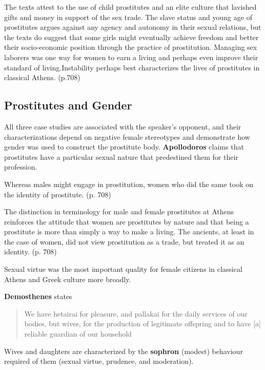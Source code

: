 The texts attest to the use of child prostitutes and an elite culture that lavished gifts and money in support of the sex trade. The slave status and young age of prostitutes argues against any agency and autonomy in their sexual relations, but the texts do suggest that some girls might eventually achieve freedom and better their socio-economic position through the practice of prostitution. Managing sex laborers was one way for women to earn a living and perhaps even improve their standard of living.Instability perhaps best characterizes the lives of prostitutes in classical Athens. (p.708)


\subsection{Prostitutes and Gender}

All three case studies are associated with the speaker's opponent, and their characterizations depend on negative female stereotypes and demonstrate how gender was used to construct the prostitute body. \textbf{Apollodoros} claims that prostitutes have a particular sexual nature that predestined them for their profession. 

\begin{rmk}
    Whereas males might engage in prostitution, women who did the same took on the identity of prostitute. (p. 708)
\end{rmk}

The distinction in terminology for male and female prostitutes at Athens reinforces the attitude that women are prostitutes by nature and that being a prostitute is more than simply a way to make a living. The ancients, at least in the case of women, did not view prostitution as a trade, but treated it as an identity. (p. 708)

\begin{nte}
    Sexual virtue was the most important quality for female citizens in classical Athens and Greek culture more broadly.
\end{nte}

\textbf{Demosthenes} states 
\begin{quotation}
    We have hetairai for pleasure, and pallakai for the daily services of our bodies, but wives, for the production of legitimate offspring and to have [a] reliable guardian of our household
\end{quotation}

Wives and daughters are characterized by the \textbf{sophron} (modest) behaviour required of them (sexual virtue, prudence, and moderation).

